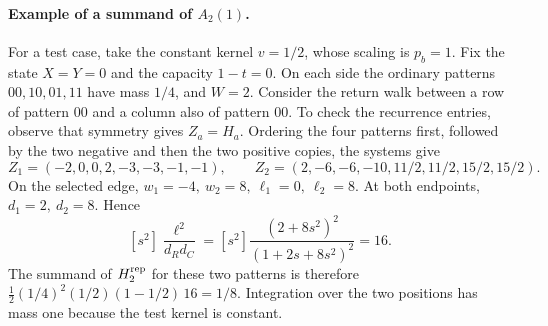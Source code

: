 \paragraph{Example of a summand of \(A_2(1)\).} For a test case, take the constant kernel \(v=1/2\),
whose scaling is \(p_b=1\). Fix the state \(X=Y=0\) and the capacity \(1-t=0\). On each side the ordinary
patterns \(00,10,01,11\) have mass \(1/4\), and \(W=2\). Consider the return walk between a row of
pattern \(00\) and a column also of pattern \(00\). To check the recurrence entries, observe that
symmetry gives \(Z_a=H_a\). Ordering the four patterns first, followed by the two negative and then the
two positive copies, the systems give \[
 Z_1=(-2,0,0,2,-3,-3,-1,-1),\qquad
 Z_2=(2,-6,-6,-10,11/2,11/2,15/2,15/2).
\] On the selected edge, \(w_1=-4,\ w_2=8,\ \ell_1=0,\ \ell_2=8\). At both endpoints, \(d_1=2,\ d_2=8\).
Hence \[
 [s^2]\frac{\ell^2}{d_Rd_C}
 =[s^2]\frac{(2+8s^2)^2}{(1+2s+8s^2)^2}=16 .
\] The summand of \(H_2^{\rm rep}\) for these two patterns is therefore
\(\tfrac12(1/4)^2(1/2)(1-1/2)\,16=1/8\). Integration over the two positions has mass one because the test
kernel is constant.
